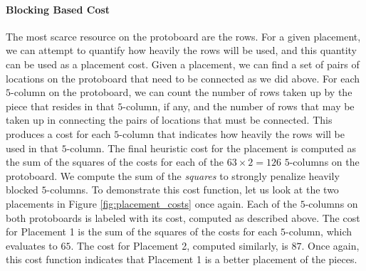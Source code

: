 \paragraph{Blocking Based Cost}
The most scarce resource on the protoboard are the rows.
For a given placement, we can attempt to quantify how heavily
the rows will be used, and this quantity can be used as a placement cost.
Given a placement, we can find a set of pairs of locations on the protoboard
that need to be connected as we did above. For each $5$-column on
the protoboard, we can count the number of rows taken up by the piece that
resides in that $5$-column, if any, and the number of rows that may be taken
up in connecting the pairs of locations that must be connected. This produces
a cost for each $5$-column that indicates how heavily the rows will be used
in that $5$-column. The final heuristic cost for the placement is computed
as the sum of the squares of the costs for each of the $63 \times 2 = 126$
$5$-columns on the protoboard. We compute the sum of the \emph{squares} to
strongly penalize heavily blocked $5$-columns.
To demonstrate this cost function, let us look at the two placements in Figure
\ref{fig:placement_costs} once again. Each of the $5$-columns on both
protoboards is labeled with its cost, computed as described above.
The cost for Placement 1 is the sum of the squares of the costs for each
$5$-column, which
evaluates to $65$. The cost for Placement 2, computed similarly, is $87$. Once
again, this cost function indicates that Placement 1 is a better placement of
the pieces.

